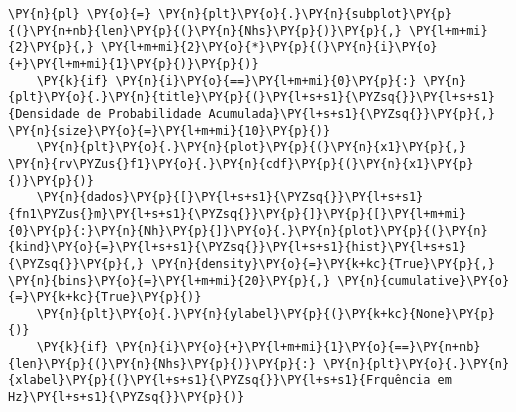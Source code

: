 \begin{tcolorbox}[breakable, size=fbox, boxrule=1pt, pad at break*=1mm,colback=cellbackground, colframe=cellborder]
\begin{Verbatim}[commandchars=\\\{\}]
    \PY{n}{pl} \PY{o}{=} \PY{n}{plt}\PY{o}{.}\PY{n}{subplot}\PY{p}{(}\PY{n+nb}{len}\PY{p}{(}\PY{n}{Nhs}\PY{p}{)}\PY{p}{,} \PY{l+m+mi}{2}\PY{p}{,} \PY{l+m+mi}{2}\PY{o}{*}\PY{p}{(}\PY{n}{i}\PY{o}{+}\PY{l+m+mi}{1}\PY{p}{)}\PY{p}{)}
    \PY{k}{if} \PY{n}{i}\PY{o}{==}\PY{l+m+mi}{0}\PY{p}{:} \PY{n}{plt}\PY{o}{.}\PY{n}{title}\PY{p}{(}\PY{l+s+s1}{\PYZsq{}}\PY{l+s+s1}{Densidade de Probabilidade Acumulada}\PY{l+s+s1}{\PYZsq{}}\PY{p}{,} \PY{n}{size}\PY{o}{=}\PY{l+m+mi}{10}\PY{p}{)}
    \PY{n}{plt}\PY{o}{.}\PY{n}{plot}\PY{p}{(}\PY{n}{x1}\PY{p}{,} \PY{n}{rv\PYZus{}f1}\PY{o}{.}\PY{n}{cdf}\PY{p}{(}\PY{n}{x1}\PY{p}{)}\PY{p}{)}
    \PY{n}{dados}\PY{p}{[}\PY{l+s+s1}{\PYZsq{}}\PY{l+s+s1}{fn1\PYZus{}m}\PY{l+s+s1}{\PYZsq{}}\PY{p}{]}\PY{p}{[}\PY{l+m+mi}{0}\PY{p}{:}\PY{n}{Nh}\PY{p}{]}\PY{o}{.}\PY{n}{plot}\PY{p}{(}\PY{n}{kind}\PY{o}{=}\PY{l+s+s1}{\PYZsq{}}\PY{l+s+s1}{hist}\PY{l+s+s1}{\PYZsq{}}\PY{p}{,} \PY{n}{density}\PY{o}{=}\PY{k+kc}{True}\PY{p}{,} \PY{n}{bins}\PY{o}{=}\PY{l+m+mi}{20}\PY{p}{,} \PY{n}{cumulative}\PY{o}{=}\PY{k+kc}{True}\PY{p}{)}
    \PY{n}{plt}\PY{o}{.}\PY{n}{ylabel}\PY{p}{(}\PY{k+kc}{None}\PY{p}{)}
    \PY{k}{if} \PY{n}{i}\PY{o}{+}\PY{l+m+mi}{1}\PY{o}{==}\PY{n+nb}{len}\PY{p}{(}\PY{n}{Nhs}\PY{p}{)}\PY{p}{:} \PY{n}{plt}\PY{o}{.}\PY{n}{xlabel}\PY{p}{(}\PY{l+s+s1}{\PYZsq{}}\PY{l+s+s1}{Frquência em Hz}\PY{l+s+s1}{\PYZsq{}}\PY{p}{)}
\end{Verbatim}
\end{tcolorbox}

    \begin{center}
    \end{center}
    { \hspace*{\fill} \\}
    
